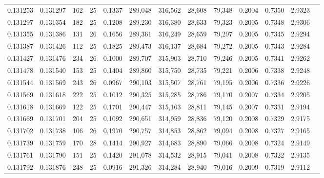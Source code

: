 \begin{tabular}{rrrrrrrrrrrrr}
0.131253 & 0.131297 & 162 &  25 &                                     0.1337 & 289,048 & 316,562 &  28,608 &  79,348 & 0.2004 & 0.7350 & 2.9323 \\
0.131297 & 0.131354 & 182 &  25 &                                     0.1208 & 289,230 & 316,380 &  28,633 &  79,323 & 0.2005 & 0.7348 & 2.9306 \\
0.131355 & 0.131386 & 131 &  26 &                                     0.1656 & 289,361 & 316,249 &  28,659 &  79,297 & 0.2005 & 0.7345 & 2.9294 \\
0.131387 & 0.131426 & 112 &  25 &                                     0.1825 & 289,473 & 316,137 &  28,684 &  79,272 & 0.2005 & 0.7343 & 2.9284 \\
0.131427 & 0.131476 & 234 &  26 &                                     0.1000 & 289,707 & 315,903 &  28,710 &  79,246 & 0.2005 & 0.7341 & 2.9262 \\
0.131478 & 0.131540 & 153 &  25 &                                     0.1404 & 289,860 & 315,750 &  28,735 &  79,221 & 0.2006 & 0.7338 & 2.9248 \\
0.131544 & 0.131569 & 243 &  26 &                                     0.0967 & 290,103 & 315,507 &  28,761 &  79,195 & 0.2006 & 0.7336 & 2.9226 \\
0.131569 & 0.131618 & 222 &  25 &                                     0.1012 & 290,325 & 315,285 &  28,786 &  79,170 & 0.2007 & 0.7334 & 2.9205 \\
0.131618 & 0.131669 & 122 &  25 &                                     0.1701 & 290,447 & 315,163 &  28,811 &  79,145 & 0.2007 & 0.7331 & 2.9194 \\
0.131669 & 0.131701 & 204 &  25 &                                     0.1092 & 290,651 & 314,959 &  28,836 &  79,120 & 0.2008 & 0.7329 & 2.9175 \\
0.131702 & 0.131738 & 106 &  26 &                                     0.1970 & 290,757 & 314,853 &  28,862 &  79,094 & 0.2008 & 0.7327 & 2.9165 \\
0.131739 & 0.131759 & 170 &  28 &                                     0.1414 & 290,927 & 314,683 &  28,890 &  79,066 & 0.2008 & 0.7324 & 2.9149 \\
0.131761 & 0.131790 & 151 &  25 &                                     0.1420 & 291,078 & 314,532 &  28,915 &  79,041 & 0.2008 & 0.7322 & 2.9135 \\
0.131792 & 0.131876 & 248 &  25 &                                     0.0916 & 291,326 & 314,284 &  28,940 &  79,016 & 0.2009 & 0.7319 & 2.9112 \\

\end{tabular}
